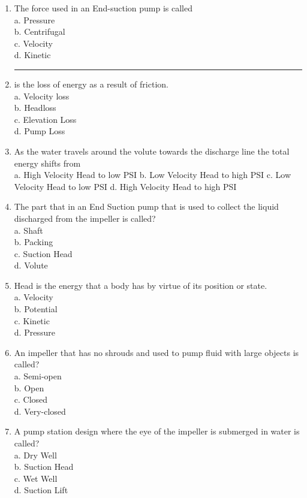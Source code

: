 \begin{enumerate}[1.]
\item The force used in an End-suction pump is called\\
a.	Pressure\\
b.	Centrifugal\\
c.	Velocity\\
d.	Kinetic\\

\item \rule{9mm}{0.5pt} is the loss of energy as a result of friction.\\
a.	Velocity loss\\
b.	Headloss\\
c.	Elevation Loss\\
d.	Pump Loss
 
\item As the water travels around the volute towards the discharge line the total energy
shifts from\\
a.	High Velocity Head to low PSI
b.	Low Velocity Head to high PSI
c.	Low Velocity Head to low PSI 
d.	High Velocity Head to high PSI

\item The part that in an End Suction pump that is used to collect the liquid discharged from the impeller is called?\\
a.	Shaft\\
b.	Packing\\
c.	Suction Head\\
d.	Volute\\

\item Head is the energy that a body has by virtue of its position or state.\\
a.	Velocity\\
b.	Potential\\
c.	Kinetic\\
d.	Pressure


\item An impeller that has no shrouds and used to pump fluid with large objects is called?\\
a.	Semi-open\\
b.	Open\\
c.	Closed\\
d.	Very-closed
 
\item A pump station design where the eye of the impeller is submerged in water is called?\\
a.	Dry Well\\
b.	Suction Head\\
c.	Wet Well\\
d.	Suction Lift



\end{enumerate}
